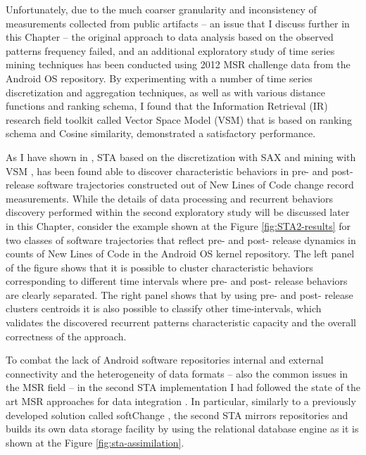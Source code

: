 Unfortunately, due to the much coarser granularity and inconsistency of measurements collected from public artifacts -- 
an issue that I discuss further in this Chapter -- the original approach to data analysis based on the observed patterns 
frequency failed, and an additional exploratory study of time series mining techniques has been conducted using 
2012 MSR challenge data \cite{MSRChallenge2012} from the Android OS repository.
By experimenting with a number of time series discretization and aggregation techniques, as well as with various distance 
functions and ranking schema, I found that the Information Retrieval (IR) research field toolkit called 
Vector Space Model (VSM) \cite{citeulike:300428} that is based on \tfidf ranking schema and Cosine similarity, 
demonstrated a satisfactory performance. 

As I have shown in \cite{csdl2-11-10}, STA based on the discretization with SAX \cite{sax} and mining with VSM 
\cite{citeulike:300428}, has been found able to discover characteristic behaviors in pre- and post- release software 
trajectories constructed out of New Lines of Code change record measurements.
While the details of data processing and recurrent behaviors discovery performed within the second exploratory study will be 
discussed later in this Chapter, consider the example shown at the Figure \ref{fig:STA2-results} 
for two classes of software trajectories that reflect pre- and post- release dynamics in counts of New Lines of Code in 
the Android OS kernel repository. 
The left panel of the figure shows that it is possible to cluster characteristic behaviors corresponding to different time intervals 
where pre- and post- release behaviors are clearly separated. 
The right panel shows that by using pre- and post- release clusters centroids it is also possible to classify other time-intervals, 
which validates the discovered recurrent patterns characteristic capacity and the overall correctness of the approach.

To combat the lack of Android software repositories internal and external connectivity and the heterogeneity 
of data formats -- also the common issues in the MSR field -- in the second STA implementation I had followed the state of 
the art MSR approaches for data integration \cite{citeulike:13058334} \cite{cvsanaly}. 
In particular, similarly to a previously developed solution called softChange \cite{german04_softchange}, the second STA mirrors 
repositories and builds its own data storage facility by using the relational database engine as it is shown at 
the Figure \ref{fig:sta-assimilation}.

